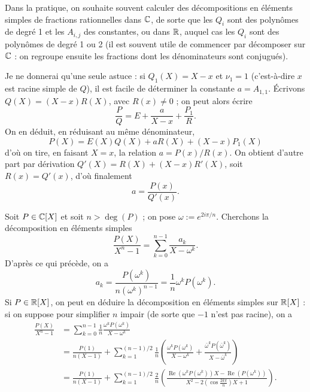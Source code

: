 \documentclass[]{report}
\begin{document}
Dans la pratique, on souhaite souvent calculer des décompositions en éléments simples de fractions rationnelles dans $\mathbb{C}$, de sorte que les $Q_i$ sont des polynômes de degré 1 et les $A_{i,j}$ des constantes, ou dans $\mathbb{R}$, auquel cas les $Q_i$ sont des polynômes de degré 1 ou 2 (il est souvent utile de commencer par décomposer sur $\mathbb{C}$ : on regroupe ensuite les fractions dont les dénominateurs sont conjugués).

Je ne donnerai qu'une seule astuce : si $Q_1(X) = X - x$ et $\nu_1 = 1$ (c'est-à-dire $x$ est racine simple de $Q$), il est facile de déterminer la constante $a = A_{1,1}$. Écrivons $Q(X) = (X - x)R(X)$, avec $R(x) \neq 0$ ; on peut alors écrire
\[\frac{P}{Q} = E + \frac{a}{X - x} + \frac{P_1}{R}.\]
On en déduit, en réduisant au même dénominateur,
\[P(X) = E(X)Q(X) + aR(X) + (X - x)P_1(X)\]
d'où on tire, en faisant $X = x$, la relation $a = P(x)/R(x)$. On obtient d'autre part par dérivation $Q'(X) = R(X) + (X - x)R'(X)$, soit $R(x) = Q'(x)$, d'où finalement
\[a = \frac{P(x)}{Q'(x)}.\]

\begin{ex}{}{}
    Soit $P \in \mathbb{C}[X]$ et soit $n > \deg(P)$ ; on pose $\omega := e^{2i\pi/n}$. Cherchons la décomposition en éléments simples
    \[\frac{P(X)}{X^n - 1} = \sum_{k = 0}^{n - 1} \frac{a_k}{X - \omega^k}.\]
    D'après ce qui précède, on a
    \[a_k = \frac{P(\omega^k)}{n(\omega^k)^{n-1}} = \frac{1}{n}\omega^k P(\omega^k).\]
    Si $P \in \mathbb{R}[X]$, on peut en déduire la décomposition en éléments simples sur $\mathbb{R}[X]$ : si on suppose pour simplifier $n$ impair (de sorte que $-1$ n'est pas racine), on a
    \begin{align*}
    \frac{P(X)}{X^n - 1} & = \sum_{k = 0}^{n - 1} \frac{1}{n} \frac{\omega^k P(\omega^k)}{X - \omega^k}\\
    & = \frac{P(1)}{n(X - 1)} + \sum_{k = 1}^{(n-1)/2} \frac{1}{n}\left(\frac{\omega^k P(\omega^k)}{X - \omega^k} + \frac{\bar{\omega}^k P(\bar{\omega}^k)}{X - \bar{\omega}^k}\right)\\
    & = \frac{P(1)}{n(X - 1)} + \sum_{k = 1}^{(n-1)/2} \frac{2}{n}\left(\frac{\operatorname{Re}(\omega^k P(\omega^k)) X - \operatorname{Re}(P(\omega^k))}{X^2 - 2\left(\cos \frac{2k\pi}{n}\right) X + 1}\right).
    \end{align*}
\end{ex}
\end{document}
